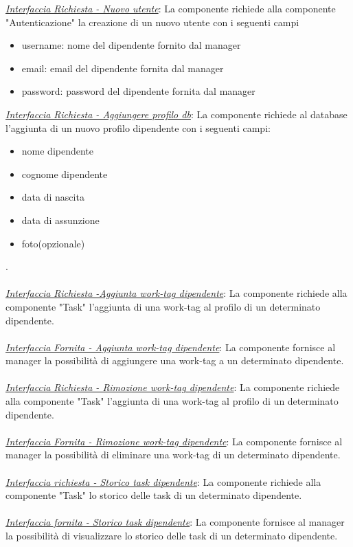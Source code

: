 \documentclass{report}
\begin{document}
\uline{\textit{Interfaccia Richiesta - Nuovo utente}}: 
La componente richiede alla componente "Autenticazione" la creazione di un nuovo utente con i seguenti campi
\begin{itemize}
	\item username: nome del dipendente fornito dal manager
	\item email: email del dipendente fornita dal manager
	\item password: password del dipendente fornita dal manager
\end{itemize}
\uline{\textit{Interfaccia Richiesta - Aggiungere profilo db}}:
La componente richiede al database l'aggiunta di un nuovo profilo dipendente con i seguenti campi:
\begin{itemize}
	\item nome dipendente
	\item cognome dipendente
	\item data di nascita
	\item data di assunzione
	\item foto(opzionale)
\end{itemize}.\\\\
\uline{\textit{Interfaccia Richiesta -Aggiunta work-tag dipendente}}:
La componente richiede alla componente "Task" l'aggiunta di una work-tag al profilo di un determinato dipendente.\\\\
\uline{\textit{Interfaccia Fornita - Aggiunta work-tag dipendente}}:
La componente fornisce al manager la possibilità di aggiungere una work-tag a un determinato dipendente.\\\\
\uline{\textit{Interfaccia Richiesta - Rimozione work-tag dipendente}}:
La componente richiede alla componente "Task" l'aggiunta di una work-tag al profilo di un determinato dipendente.\\\\
\uline{\textit{Interfaccia Fornita - Rimozione work-tag dipendente}}:
La componente fornisce al manager la possibilità di eliminare una work-tag di un determinato dipendente.\\\\
\uline{\textit{Interfaccia richiesta - Storico task dipendente}}:
La componente richiede alla componente "Task" lo storico delle task di un determinato dipendente.\\\\
\uline{\textit{Interfaccia fornita - Storico task dipendente}}:
La componente fornisce al manager la possibilità di visualizzare lo storico delle task di un determinato dipendente.
\end{document}
